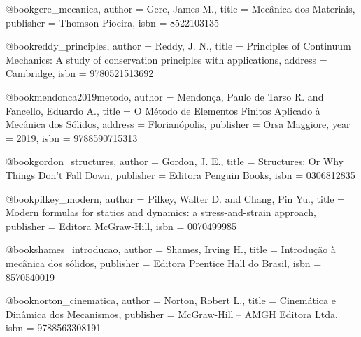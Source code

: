 @book{gere_mecanica,
  author = {Gere, James M.},
  title = {Mecânica dos Materiais},
  publisher = {Thomson Pioeira},
  isbn = {8522103135}%
}

@book{reddy_principles,
  author = {Reddy, J. N.},
  title = {Principles of Continuum Mechanics: A study of conservation principles with applications},
  address = {Cambridge},
  isbn = {9780521513692}
}

@book{mendonca2019metodo,
  author = {Mendonça, Paulo de Tarso R. and Fancello, Eduardo A.},
  title = {O Método de Elementos Finitos Aplicado à Mecânica dos Sólidos},
  address = {Florianópolis},
  publisher = {Orsa Maggiore},
  year = {2019},
  isbn = {9788590715313}
}

@book{gordon_structures,
  author = {Gordon, J. E.},
  title = {Structures: Or Why Things Don't Fall Down},
  publisher = {Editora Penguin Books},
  isbn = {0306812835}
}

@book{pilkey_modern,
  author = {Pilkey, Walter D. and Chang, Pin Yu.},
  title = {Modern formulas for statics and dynamics: a stress-and-strain approach},
  publisher = {Editora McGraw-Hill},
  isbn = {0070499985}
}

@book{shames_introducao,
  author = {Shames, Irving H.},
  title = {Introdução à mecânica dos sólidos},
  publisher = {Editora Prentice Hall do Brasil},
  isbn = {8570540019}
}

%

@book{norton_cinematica,
  author = {Norton, Robert L.},
  title = {Cinemática e Dinâmica dos Mecanismos},
  publisher = {McGraw-Hill – AMGH Editora Ltda},
  isbn = {9788563308191}
}

